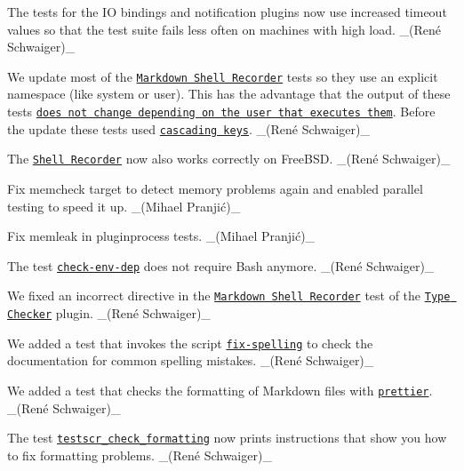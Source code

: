\begin{DoxyItemize}
\item The tests for the IO bindings and notification plugins now use increased timeout values so that the test suite fails less often on machines with high load. \+\_\+(René Schwaiger)\+\_\+
\item We update most of the \href{https://master.libelektra.org/tests/shell/shell_recorder/tutorial_wrapper}{\tt Markdown Shell Recorder} tests so they use an explicit namespace (like {\ttfamily system} or {\ttfamily user}). This has the advantage that the output of these tests \href{https://issues.libelektra.org/1773}{\tt does not change depending on the user that executes them}. Before the update these tests used \href{https://www.libelektra.org/tutorials/namespaces}{\tt cascading keys}. \+\_\+(René Schwaiger)\+\_\+
\item The \href{https://master.libelektra.org/tests/shell/shell_recorder}{\tt Shell Recorder} now also works correctly on Free\+B\+SD. \+\_\+(René Schwaiger)\+\_\+
\item Fix memcheck target to detect memory problems again and enabled parallel testing to speed it up. \+\_\+(Mihael Pranjić)\+\_\+
\item Fix memleak in pluginprocess tests. \+\_\+(Mihael Pranjić)\+\_\+
\item The test \href{https://master.libelektra.org/scripts/check-env-dep}{\tt {\ttfamily check-\/env-\/dep}} does not require Bash anymore. \+\_\+(René Schwaiger)\+\_\+
\item We fixed an incorrect directive in the \href{https://master.libelektra.org/tests/shell/shell_recorder/tutorial_wrapper}{\tt Markdown Shell Recorder} test of the \href{https://www.libelektra.org/plugins/typechecker}{\tt Type Checker} plugin. \+\_\+(René Schwaiger)\+\_\+
\item We added a test that invokes the script \href{http://master.libelektra.org/scripts/fix-spelling}{\tt {\ttfamily fix-\/spelling}} to check the documentation for common spelling mistakes. \+\_\+(René Schwaiger)\+\_\+
\item We added a test that checks the formatting of Markdown files with \href{https://prettier.io}{\tt {\ttfamily prettier}}. \+\_\+(René Schwaiger)\+\_\+
\item The test \href{https://master.libelektra.org/tests/shell/check_formatting.sh}{\tt {\ttfamily testscr\+\_\+check\+\_\+formatting}} now prints instructions that show you how to fix formatting problems. \+\_\+(René Schwaiger)\+\_\+
\end{DoxyItemize}

